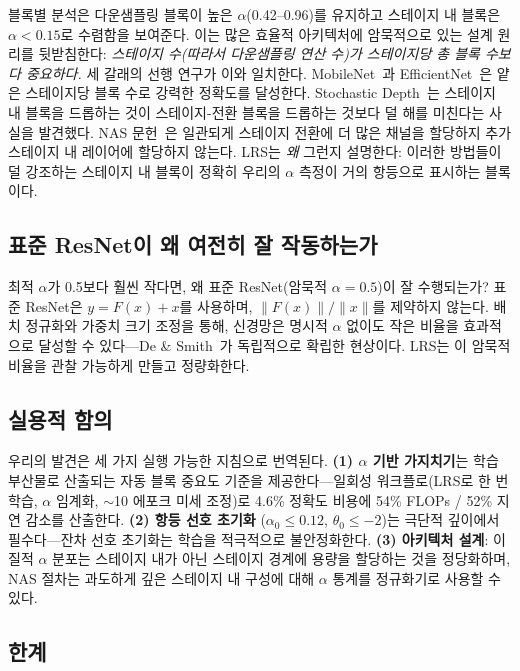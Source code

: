 \documentclass{bmvc2k}
\begin{document}
블록별 분석은 다운샘플링 블록이 높은 $\alpha$(0.42--0.96)를 유지하고 스테이지 내 블록은 $\alpha < 0.15$로 수렴함을 보여준다. 이는 많은 효율적 아키텍처에 암묵적으로 있는 설계 원리를 뒷받침한다: \emph{스테이지 수(따라서 다운샘플링 연산 수)가 스테이지당 총 블록 수보다 중요하다.} 세 갈래의 선행 연구가 이와 일치한다. MobileNet~\cite{howard2017mobilenets}과 EfficientNet~\cite{tan2019efficientnet}은 얕은 스테이지당 블록 수로 강력한 정확도를 달성한다. Stochastic Depth~\cite{huang2016deep}는 스테이지 내 블록을 드롭하는 것이 스테이지-전환 블록을 드롭하는 것보다 덜 해를 미친다는 사실을 발견했다. NAS 문헌~\cite{tan2019efficientnet}은 일관되게 스테이지 전환에 더 많은 채널을 할당하지 추가 스테이지 내 레이어에 할당하지 않는다. LRS는 \emph{왜} 그런지 설명한다: 이러한 방법들이 덜 강조하는 스테이지 내 블록이 정확히 우리의 $\alpha$ 측정이 거의 항등으로 표시하는 블록이다.

\subsection{표준 ResNet이 왜 여전히 잘 작동하는가}

최적 $\alpha$가 0.5보다 훨씬 작다면, 왜 표준 ResNet(암묵적 $\alpha = 0.5$)이 잘 수행되는가? 표준 ResNet은 $y = F(x) + x$를 사용하며, $\|F(x)\|/\|x\|$를 제약하지 않는다. 배치 정규화와 가중치 크기 조정을 통해, 신경망은 명시적 $\alpha$ 없이도 작은 비율을 효과적으로 달성할 수 있다---De \& Smith~\cite{de2020batch}가 독립적으로 확립한 현상이다. LRS는 이 암묵적 비율을 관찰 가능하게 만들고 정량화한다.

\subsection{실용적 함의}
\label{sec:practical_implications}

우리의 발견은 세 가지 실행 가능한 지침으로 번역된다. \textbf{(1) $\alpha$ 기반 가지치기}는 학습 부산물로 산출되는 자동 블록 중요도 기준을 제공한다---일회성 워크플로(LRS로 한 번 학습, $\alpha$ 임계화, $\sim$10 에포크 미세 조정)로 4.6\% 정확도 비용에 54\% FLOPs / 52\% 지연 감소를 산출한다. \textbf{(2) 항등 선호 초기화} ($\alpha_0 \leq 0.12$, $\theta_0 \leq -2$)는 극단적 깊이에서 필수다---잔차 선호 초기화는 학습을 적극적으로 불안정화한다. \textbf{(3) 아키텍처 설계}: 이질적 $\alpha$ 분포는 스테이지 내가 아닌 스테이지 경계에 용량을 할당하는 것을 정당화하며, NAS 절차는 과도하게 깊은 스테이지 내 구성에 대해 $\alpha$ 통계를 정규화기로 사용할 수 있다.

\subsection{한계}
\end{document}
